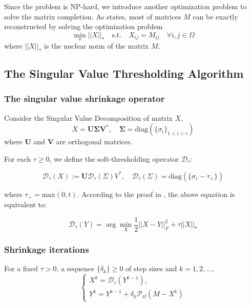 \documentclass[letter,10pt]{article}
\begin{document}
Since the problem is NP-hard, we introduce another optimization problem to solve the matrix completion.
As \cite{cai2008} states, most of matrices $M$ can be exactly reconstructed by solving the optimization problem
\begin{equation}
\min_{x} ||X||_* \quad \text{s.t.} \quad X_{ij} = M_{ij} \quad \forall i, j\in \Omega
\end{equation}
where $||X||_*$ is the nuclear norm of the matrix $M$.

\subsection{The Singular Value Thresholding Algorithm}

\subsubsection{The singular value shrinkage operator}
Consider the Singular Value Decomposition of matrix $X$,
\begin{equation}
X=\mathbf{U\Sigma V^*}, \quad \mathbf{\Sigma}=\text{diag}(\{\sigma_i\}_{1<i<r})
\end{equation}
where $\mathbf{U}$ and $\mathbf{V}$ are orthogonal matrices.

For each $\tau \geq 0$, we define the soft-thresholding operator $\mathcal{D}_\tau$:

\begin{equation}
\mathcal{D}_\tau(X):=\textbf{U}\mathcal{D}_\tau(\Sigma)V^*, \quad \mathcal{D}_\tau(\Sigma)=
\text{diag}(\{\sigma_i-\tau_+\})
\end{equation}

where $\tau_+=\text{max}(0,t)$. According to the proof in \cite{cai2008}, the above equation is equivalent to:

\begin{equation}
\mathcal{D}_\tau(Y)=\arg\min_{X} \frac{1}{2}||X-Y||_F^2+\tau||X||_*
\end{equation}

\subsubsection{Shrinkage iterations}

For a fixed $\tau > 0$, a sequence $\{\delta_k\} \geq 0$ of step sizes and $k=1, 2, ...,$
\[
\begin{cases}
X^k=\mathcal{D}_\tau(Y^{k-1}),\\
Y^k=Y^{k-1}+\delta_k\mathcal{P}_\Omega(M-X^k)
\end{cases}
\]
\end{document}
